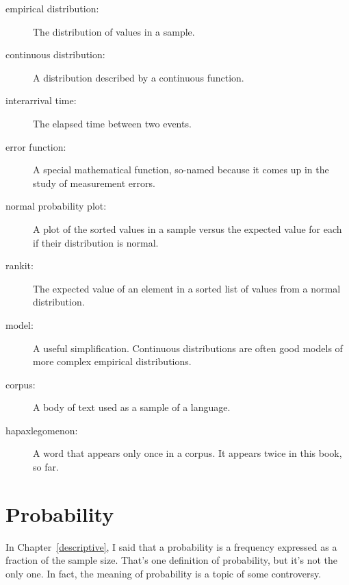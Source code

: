 \documentclass[12pt]{book}
\begin{document}
\begin{description}

\item[empirical distribution:] The distribution of values in a sample.

\item[continuous distribution:] A distribution described by a continuous
function.

\item[interarrival time:] The elapsed time between two events.

\item[error function:] A special mathematical function, so-named
  because it comes up in the study of measurement errors.

\item[normal probability plot:] A plot of the sorted values in a sample
versus the expected value for each if their distribution is normal.

\item[rankit:] The expected value of an element in a sorted list of
values from a normal distribution.

\item[model:] A useful simplification.  Continuous distributions are
often good models of more complex empirical distributions.

\item[corpus:] A body of text used as a sample of a language.

\item[hapaxlegomenon:] A word that appears only once in a corpus.
It appears twice in this book, so far.

\end{description}


\chapter{Probability}
\label{probability}

In Chapter~\ref{descriptive}, I said that a probability is a frequency
expressed as a fraction of the sample size.  That's one definition of
probability, but it's not the only one.  In fact, the meaning
of probability is a topic of some controversy.
\end{document}
